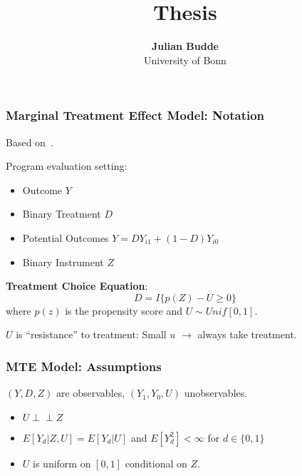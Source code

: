 \documentclass[11pt, aspectratio=169]{beamer}
\newcommand{\indep}{\perp\!\!\!\!\perp}
\begin{document}
\title{Thesis}

\author[Julian Budde]
{
{\bf Julian Budde}\\
{\small University of Bonn}\\[1ex]
}


\begin{frame}
    \titlepage
    \note{~}
\end{frame}

\begin{frame}
    \frametitle{Marginal Treatment Effect Model: Notation}

    Based on~\cite{mogstad2018using}.

    \vspace{0.5cm}

    Program evaluation setting:
    \begin{itemize}
        \item Outcome $Y$
        \item Binary Treatment $D$
        \item Potential Outcomes $Y = D Y_{i1} + (1-D) Y_{i0}$
        \item Binary Instrument $Z$
    \end{itemize}

    \vspace{0.5cm}

    \textbf{Treatment Choice Equation}:
    \begin{equation}
        D = I\{p(Z) - U \geq 0\}
    \end{equation}
    where $p(z)$ is the propensity score and $U\sim Unif[0,1]$.

    \vspace{0.5cm}

    $U$ is ``resistance'' to treatment: Small $u$ $\rightarrow$ always take treatment.

\end{frame}

\begin{frame}
    \frametitle{MTE Model: Assumptions}
    $(Y,D,Z)$ are observables, $(Y_1, Y_0, U)$ unobservables.


    \begin{itemize}
        \item $U \indep Z$
        \item $E[Y_d|Z,U] = E[Y_d|U]$ and $E[Y_d^2] < \infty$ for $d \in \{0,1\}$
        \item $U$ is uniform on $[0,1]$ conditional on $Z$.
    \end{itemize}

\end{frame}
\end{document}
